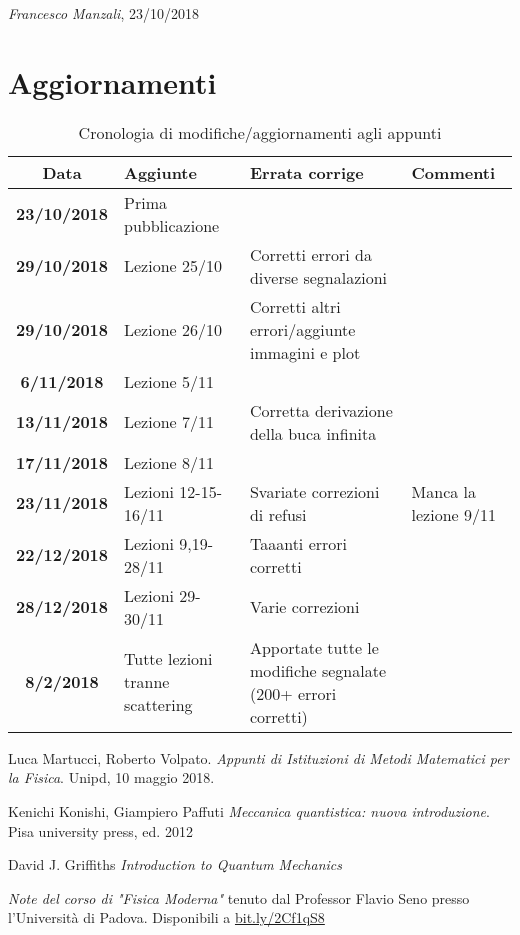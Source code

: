 \documentclass[12pt]{report}
\begin{document}
\begin{flushright}
\textit{Francesco Manzali}, 23/10/2018
\end{flushright}
\clearpage
\section*{Aggiornamenti}
\begin{table}[hb]
    \centering
    \begin{tabular}{|cm{3cm}m{5cm}m{3cm}|}\toprule
        Data & Aggiunte & Errata corrige & Commenti\\\midrule
        \textbf{23/10/2018} & Prima pubblicazione & & \\
        \textbf{29/10/2018} & Lezione 25/10 & Corretti errori da diverse segnalazioni & \\
        \textbf{29/10/2018} & Lezione 26/10 & Corretti altri errori/aggiunte immagini e plot & \\
        \textbf{6/11/2018} & Lezione 5/11 & &\\
        \textbf{13/11/2018} & Lezione 7/11 & Corretta derivazione della buca infinita &\\
        \textbf{17/11/2018} & Lezione 8/11 & &\\
        \textbf{23/11/2018} & Lezioni 12-15-16/11 & Svariate correzioni di refusi & Manca la lezione 9/11\\
        \textbf{22/12/2018} & Lezioni 9,19-28/11 & Taaanti errori corretti & \\
        \textbf{28/12/2018} & Lezioni 29-30/11 & Varie correzioni &\\
        \textbf{8/2/2018} & Tutte lezioni tranne scattering & Apportate tutte le modifiche segnalate (200+ errori corretti) \\
        \bottomrule
    \end{tabular}
    \caption{Cronologia di modifiche/aggiornamenti agli appunti}
    \label{updates}
\end{table}

\clearpage






\clearpage
\begin{thebibliography}{9}

Luca Martucci, Roberto Volpato.
\textit{Appunti di Istituzioni di Metodi Matematici per la Fisica}. 
Unipd, 10 maggio 2018.
 
Kenichi Konishi, Giampiero Paffuti
\textit{Meccanica quantistica: nuova introduzione}.
Pisa university press, ed. 2012

David J. Griffiths
\textit{Introduction to Quantum Mechanics}

\textit{Note del corso di "Fisica Moderna"} tenuto dal Professor Flavio Seno presso l'Università di Padova.
Disponibili a \url{bit.ly/2Cf1qS8}
\end{thebibliography}

\printindex
\end{document}
